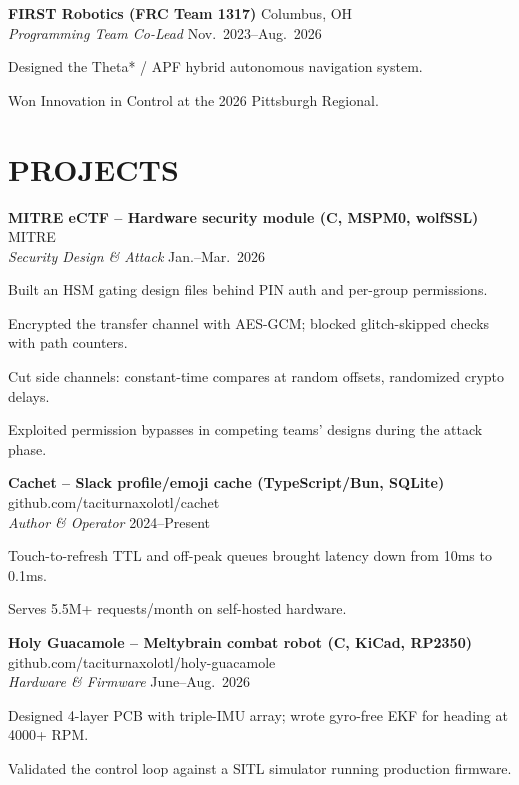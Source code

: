 \documentclass[a4paper,10pt]{article}
\makeatletter
\newlength{\mpwidth}
\newenvironment{orgblock}[2]{%
  \par\noindent\textbf{#1} \hfill #2\\%
}{\par\vspace{3pt}}
\newenvironment{subxp}[2]{%
  \noindent\textit{#1} \hfill #2\\%
  \begin{minipage}[t]{\mpwidth}%
    \begingroup
      \setlength{\leftskip}{0pt}\setlength{\parindent}{0pt}\setlength{\parskip}{0pt}
      \makeatletter
      \def\my@itemize{%
        \list{\labelitemi}{%
          \setlength{\leftmargin}{0.8em}%
          \setlength{\itemindent}{0pt}%
          \setlength{\labelsep}{0.6em}%
          \setlength{\labelwidth}{0pt}%
          \setlength{\parsep}{0pt}%
          \setlength{\topsep}{0pt}%
          \setlength{\partopsep}{0pt}%
          \setlength{\itemsep}{2pt}%
        }%
      }%
      \makeatother
      \renewcommand{\labelitemi}{\textendash}%
      \my@itemize
}{%
      \endlist
    \endgroup
  \end{minipage}%
  \par\vspace{2pt}%
}
\makeatother
\begin{document}
\begin{orgblock}{FIRST Robotics (FRC Team 1317)}{Columbus, OH}
  \begin{subxp}{Programming Team Co-Lead}{Nov.\ 2023--Aug.\ 2026}
    \item Designed the Theta* / APF hybrid autonomous navigation system.
    \item Won Innovation in Control at the 2026 Pittsburgh Regional.
  \end{subxp}
\end{orgblock}

\section{PROJECTS}
\begin{orgblock}{MITRE eCTF -- Hardware security module (C, MSPM0, wolfSSL)}{MITRE}
  \begin{subxp}{Security Design \& Attack}{Jan.--Mar.\ 2026}
    \item Built an HSM gating design files behind PIN auth and per-group permissions.
    \item Encrypted the transfer channel with AES-GCM; blocked glitch-skipped checks with path counters.
    \item Cut side channels: constant-time compares at random offsets, randomized crypto delays.
    \item Exploited permission bypasses in competing teams' designs during the attack phase.
  \end{subxp}
\end{orgblock}

\begin{orgblock}{Cachet -- Slack profile/emoji cache (TypeScript/Bun, SQLite)}{github.com/taciturnaxolotl/cachet}
  \begin{subxp}{Author \& Operator}{2024--Present}
    \item Touch-to-refresh TTL and off-peak queues brought latency down from 10ms to 0.1ms.
    \item Serves 5.5M+ requests/month on self-hosted hardware.
  \end{subxp}
\end{orgblock}

\begin{orgblock}{Holy Guacamole -- Meltybrain combat robot (C, KiCad, RP2350)}{github.com/taciturnaxolotl/holy-guacamole}
  \begin{subxp}{Hardware \& Firmware}{June--Aug.\ 2026}
    \item Designed 4-layer PCB with triple-IMU array; wrote gyro-free EKF for heading at 4000+ RPM.
    \item Validated the control loop against a SITL simulator running production firmware.
  \end{subxp}
\end{orgblock}
\end{document}
